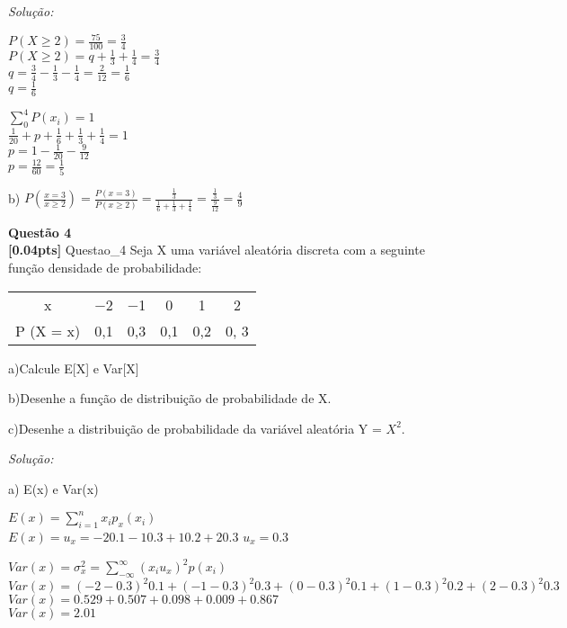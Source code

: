 \documentclass{article}
\newenvironment{problem}[2][Questão]
    { \begin{mdframed}[backgroundcolor=gray!20] \textbf{#1 #2} \\}
    {  \end{mdframed}}
\newenvironment{solution}
    {\textit{Solução:}}
    {}
\begin{document}
\begin{solution}

$P(X \geq 2) = \frac{75}{100} = \frac{3}{4}$ \\
$P(X \geq 2) = q + \frac{1}{3} + \frac{1}{4} = \frac{3}{4}$ \\
$q = \frac{3}{4} - \frac{1}{3} - \frac{1}{4} = \frac{2}{12} = \frac{1}{6}$ \\
$q=\frac{1}{6}$ 

$\sum_{0}^{4} P(x_{i}) = 1$ \\
$\frac{1}{20} + p + \frac{1}{6} + \frac{1}{3} + \frac{1}{4} = 1$ \\
$p = 1 - \frac{1}{20} - \frac{9}{12}$ \\
$p = \frac{12}{60} = \frac{1}{5}$

\hrulefill

b)
$P(\frac{x=3}{x \geq 2}) = \frac{P(x=3)}{P(x \geq 2)} = \frac{\frac{1}{3}}{\frac{1}{6}+\frac{1}{3}+\frac{1}{4}} = \frac{\frac{1}{3}}{\frac{9}{12}} = \frac{4}{9}$

\end{solution}

\begin{problem}{4}
\textbf{[0.04pts]} Questao\_4 Seja X uma variável aleatória discreta com a seguinte função densidade de probabilidade: 


\begin{center}
\begin{tabular}{ |c|c|c|c|c|c|}
\hline

x & −2 & −1 & 0 & 1 & 2 \\
P (X = x) & 0,1 & 0,3 & 0,1 & 0,2 & 0, 3 \\

 \hline
\end{tabular}
\end{center}

a)Calcule  E[X]  e  Var[X]

b)Desenhe a função de distribuição de probabilidade de X.  

c)Desenhe a distribuição de probabilidade da variável aleatória Y  = $X^{2}$.

\end{problem}

\begin{solution}

a) E(x) e Var(x)

$E(x) = \sum_{i=1}^{n} x_{i} p_{x}(x_{i})$ \\
$E(x) = u_{x} = -2 0.1 - 1 0.3 + 1 0.2 + 2 0.3$
$u_{x} = 0.3$

$Var(x) = \sigma_{x}^{2} = \sum_{-\infty}^{\infty} (x_{i}u_{x})^{2} p(x_{i})$ \\

$ Var(x) = (-2-0.3)^{2} 0.1 + (-1-0.3)^2 0.3 + (0 - 0.3)^{2}0.1 + (1-0.3)^{2}0.2+ (2-0.3)^{2}0.3$ \\

$Var(x) = 0.529 + 0.507 + 0.098 + 0.009 + 0.867$ \\
$Var(x) = 2.01$

\end{solution}
\end{document}
